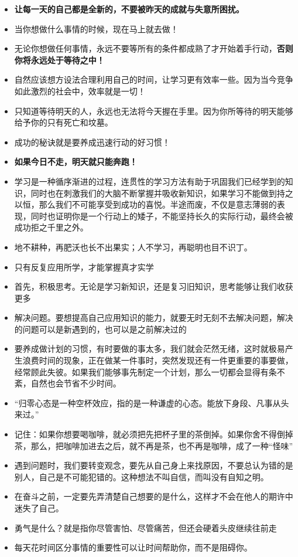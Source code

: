 \documentclass[UTF8,a4paper,8pt]{ctexart}
\begin{document}
\begin{itemize}
 	\item \textbf{让每一天的自己都是全新的，不要被昨天的成就与失意所困扰。}
 	\item 当你想做什么事情的时候，现在马上就去做！
 	\item 无论你想做任何事情，永远不要等所有的条件都成熟了才开始着手行动，\textbf{否则你将永远处于等待之中！}
 	\item 自然应该想方设法合理利用自己的时间，让学习更有效率一些。因为当今竞争如此激烈的社会中，效率就是一切！
 	\item 只知道等待明天的人，永远也无法将今天握在手里。因为你所等待的明天能够给予你的只有死亡和坟墓。
 	\item 成功的秘诀就是要养成迅速行动的好习惯！
 	\item \textbf{如果今日不走，明天就只能奔跑！}
 	\item 学习是一种循序渐进的过程，连贯性的学习方法有助于巩固我们已经学到的知识，同时也在刺激我们的大脑不断掌握并吸收新知识，如果学习不能做到持之以恒，那么我们不可能享受到成功的喜悦。半途而废，不仅是意志薄弱的表现，同时也证明你是一个行动上的矮子，不能坚持长久的实际行动，最终会被成功拒之千里之外。
 	\item 地不耕种，再肥沃也长不出果实；人不学习，再聪明也目不识丁。
 	\item 只有反复应用所学，才能掌握真才实学
 	\item 首先，积极思考。无论是学习新知识，还是复习旧知识，思考能够让我们收获更多
 	\item 解决问题。要想提高自己应用知识的能力，就要无时无刻不去解决问题，解决的问题可以是新遇到的，也可以是之前解决过的
 	\item 要养成做计划的习惯，有时要做的事太多，我们就会茫然无绪，这时就极易产生浪费时间的现象，正在做某一件事时，突然发现还有一件更重要的事要做，经常顾此失彼。如果我们能够事先制定一个计划，那么一切都会显得有条不紊，自然也会节省不少时间。
 	\item “归零心态是一种空杯效应，指的是一种谦虚的心态。能放下身段、凡事从头来过。”
 	\item 记住：如果你想要喝咖啡，就必须把先把杯子里的茶倒掉。如果你舍不得倒掉茶，那么，把咖啡加进去之后，就不再是茶，也不再是咖啡，成了一种“怪味”
 	\item 遇到问题时，我们要转变观念，要先从自己身上来找原因，不要总认为错的是别人，自己是不可能犯错的。这种想法不叫自信，而叫没有自知之明。
 	\item 
 	在奋斗之前，一定要先弄清楚自己想要的是什么，这样才不会在他人的期许中迷失了自己。
 	\item 勇气是什么？就是指你尽管害怕、尽管痛苦，但还会硬着头皮继续往前走
 	\item 每天花时间区分事情的重要性可以让时间帮助你，而不是阻碍你。
 \end{itemize}
 
\end{document}
